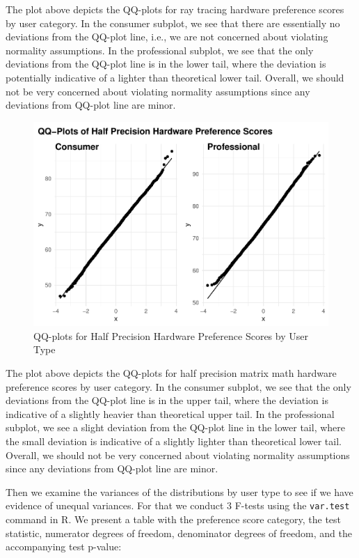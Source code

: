\documentclass[
]{article}
\begin{document}
The plot above depicts the QQ-plots for ray tracing hardware preference
scores by user category. In the consumer subplot, we see that there are
essentially no deviations from the QQ-plot line, i.e., we are not
concerned about violating normality assumptions. In the professional
subplot, we see that the only deviations from the QQ-plot line is in the
lower tail, where the deviation is potentially indicative of a lighter
than theoretical lower tail. Overall, we should not be very concerned
about violating normality assumptions since any deviations from QQ-plot
line are minor.

\begin{figure}

{\centering \includegraphics[width=0.6\linewidth,]{Assignment1_files/figure-latex/unnamed-chunk-13-1} 

}

\caption{QQ-plots for Half Precision Hardware Preference Scores by User Type}\label{fig:unnamed-chunk-13}
\end{figure}

The plot above depicts the QQ-plots for half precision matrix math
hardware preference scores by user category. In the consumer subplot, we
see that the only deviations from the QQ-plot line is in the upper tail,
where the deviation is indicative of a slightly heavier than theoretical
upper tail. In the professional subplot, we see a slight deviation from
the QQ-plot line in the lower tail, where the small deviation is
indicative of a slightly lighter than theoretical lower tail. Overall,
we should not be very concerned about violating normality assumptions
since any deviations from QQ-plot line are minor.

Then we examine the variances of the distributions by user type to see
if we have evidence of unequal variances. For that we conduct 3 F-tests
using the \texttt{var.test} command in R. We present a table with the
preference score category, the test statistic, numerator degrees of
freedom, denominator degrees of freedom, and the accompanying test
p-value:
\end{document}
